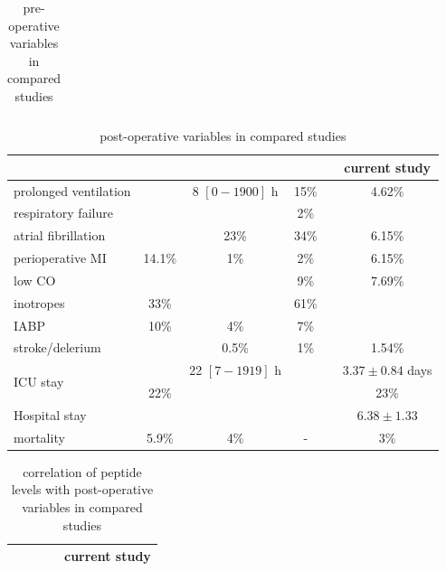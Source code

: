 \documentclass[14pt,a4paper,onecolumn]{extarticle}
\begin{document}
\begin{landscape}
\begin{table}
\begin{tabular}{|l|c|c|c|c|c|}
        \hline
    \end{tabular}
    \caption{pre-operative variables in compared studies}
    \label{meta_preoperative}
\end{table}
\end{landscape}


\begin{landscape}
\begin{table}
	\centering
    \caption{post-operative variables in compared studies}
    \begin{tabular}{|l|c|c|c|c|c|}
        \hline
            & \cite{Eliasdottir2008} & \cite{Schachner2010} & \cite{Krzych2011} & \cite{Chen2013} & current study \\
        \hline


        prolonged ventilation &  & 8 $[0-1900]$ h & 15\% &  & 4.62\% \\
        respiratory failure &  &  & 2\% &  &  \\
        atrial fibrillation &  & 23\% & 34\% &  & 6.15\% \\
        perioperative MI & 14.1\% & 1\% & 2\% &  & 6.15\% \\
        low CO &  &  & 9\% &  & 7.69\% \\
        inotropes & 33\% &  & 61\% &  &  \\
        IABP & 10\% & 4\% & 7\% &  &  \\
        stroke/delerium &  & 0.5\% & 1\% &  & 1.54\% \\
        \multirow{2}{*}{ICU stay} &  & 22 $[7-1919]$ h &  &  & $3.37\pm0.84$ days \\
                                  & 22\% &  &  &  & 23\% \\
        Hospital stay &  &  &  &  & $6.38\pm1.33$ \\
        mortality & 5.9\% & 4\% & - &  & 3\% \\

        \hline
    \end{tabular}
    \label{meta_postoperative}
\end{table}
\end{landscape}


\begin{landscape}
\begin{table}
	\centering
    \caption{correlation of peptide levels with post-operative variables in compared studies}
    \begin{tabular}{|l|c|c|c|c|}
        \hline
            & \cite{Schachner2010} & \cite{Krzych2011} & \cite{Chen2013} & current study \\
        \hline

        \hline
    \end{tabular}
    \label{meta_correlation}
\end{table}
\end{landscape}
\end{document}

